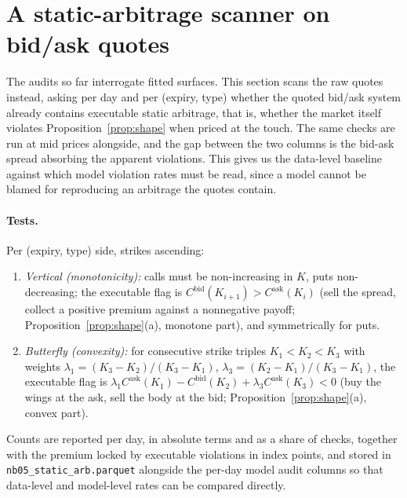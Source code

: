 \section{A static-arbitrage scanner on bid/ask quotes}\label{sec:scanner}

The audits so far interrogate fitted surfaces. This section scans the raw quotes instead,
asking per day and per (expiry, type) whether the quoted bid/ask system already contains
executable static arbitrage, that is, whether the market itself violates
Proposition~\ref{prop:shape} when priced at the touch. The same checks are run at mid prices
alongside, and the gap between the two columns is the bid-ask spread absorbing the apparent
violations. This gives us the data-level baseline against which model violation rates must be
read, since a model cannot be blamed for reproducing an arbitrage the quotes contain.

\paragraph{Tests.} Per (expiry, type) side, strikes ascending:
\begin{enumerate}[label=(S\arabic*)]
\item \emph{Vertical (monotonicity):} calls must be non-increasing in $K$, puts
non-decreasing; the executable flag is $C^{\mathrm{bid}}(K_{i+1})>C^{\mathrm{ask}}(K_i)$
(sell the spread, collect a positive premium against a nonnegative payoff;
Proposition~\ref{prop:shape}(a), monotone part), and symmetrically for puts.
\item \emph{Butterfly (convexity):} for consecutive strike triples $K_1<K_2<K_3$ with
weights $\lambda_1=(K_3-K_2)/(K_3-K_1)$, $\lambda_3=(K_2-K_1)/(K_3-K_1)$, the executable
flag is $\lambda_1C^{\mathrm{ask}}(K_1)-C^{\mathrm{bid}}(K_2)+\lambda_3C^{\mathrm{ask}}(K_3)<0$
(buy the wings at the ask, sell the body at the bid;
Proposition~\ref{prop:shape}(a), convex part).
\end{enumerate}
Counts are reported per day, in absolute terms and as a share of checks, together with the
premium locked by executable violations in index points, and stored in
\texttt{nb05\_static\_arb.parquet} alongside the per-day model audit columns so that
data-level and model-level rates can be compared directly.

